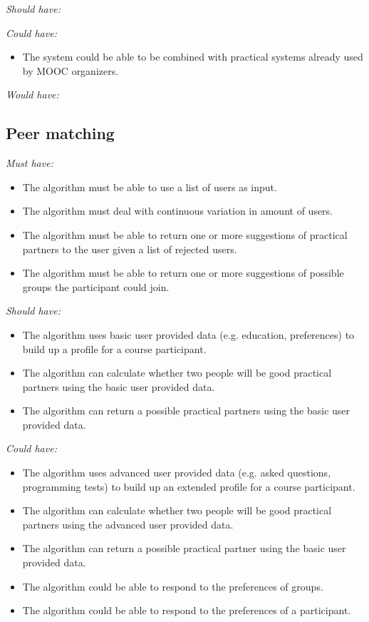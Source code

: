\documentclass[]{article}
\newcommand{\reqr}[1]{{\noindent\emph{#1:}}}
\begin{document}
\reqr{Should have}

\reqr{Could have}
\begin{itemize}
\item The system could be able to be combined with practical systems already used by MOOC organizers.
\end{itemize}

\reqr{Would have}

\subsection{Peer matching}
\reqr{Must have}
\begin{itemize}
\item The algorithm must be able to use a list of users as input.
\item The algorithm must deal with continuous variation in amount of users.
\item The algorithm must be able to return one or more suggestions of practical partners to the user given a list of rejected users.
\item The algorithm must be able to return one or more suggestions of possible groups the participant could join.
\end{itemize}

\reqr{Should have}
\begin{itemize}
\item The algorithm uses basic user provided data (e.g. education, preferences) to build up a profile for a course participant.
\item The algorithm can calculate whether two people will be good practical partners using the basic user provided data.
\item The algorithm can return a possible practical partners using the basic user provided data.
\end{itemize}

\reqr{Could have}
\begin{itemize}
\item The algorithm uses advanced user provided data (e.g. asked questions, programming tests) to build up an extended profile for a course participant.
\item The algorithm can calculate whether two people will be good practical partners using the advanced user provided data.
\item The algorithm can return a possible practical partner using the basic user provided data.
\item The algorithm could be able to respond to the preferences of groups.
\item The algorithm could be able to respond to the preferences of a participant.
\end{itemize}
\end{document}

